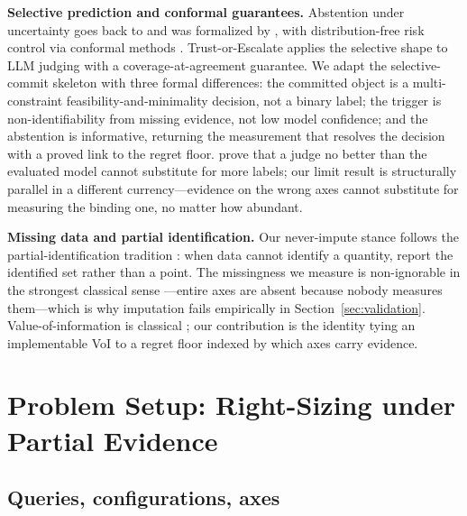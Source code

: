 \documentclass{article} %
\begin{document}
\textbf{Selective prediction and conformal guarantees.}
Abstention under uncertainty goes back to \citet{chow1970optimum} and was formalized by \citet{elyaniv2010foundations,geifman2017selective}, with distribution-free risk control via conformal methods \citep{angelopoulos2023conformal}. Trust-or-Escalate \citep{jung2025trust} applies the selective shape to LLM judging with a coverage-at-agreement guarantee. We adapt the selective-commit skeleton with three formal differences: the committed object is a multi-constraint feasibility-and-minimality decision, not a binary label; the trigger is non-identifiability from missing evidence, not low model confidence; and the abstention is informative, returning the measurement that resolves the decision with a proved link to the regret floor. \citet{dorner2025limits} prove that a judge no better than the evaluated model cannot substitute for more labels; our limit result is structurally parallel in a different currency---evidence on the wrong axes cannot substitute for measuring the binding one, no matter how abundant.

\textbf{Missing data and partial identification.}
Our never-impute stance follows the partial-identification tradition \citep{manski2003partial}: when data cannot identify a quantity, report the identified set rather than a point. The missingness we measure is non-ignorable in the strongest classical sense \citep{rubin1976inference,little2019statistical}---entire axes are absent because nobody measures them---which is why imputation fails empirically in Section~\ref{sec:validation}. Value-of-information is classical \citep{howard1966voi}; our contribution is the identity tying an implementable VoI to a regret floor indexed by which axes carry evidence.

\section{Problem Setup: Right-Sizing under Partial Evidence}
\label{sec:setup}

\subsection{Queries, configurations, axes}
\end{document}
